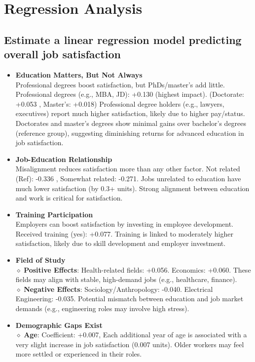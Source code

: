 \documentclass[12pt]{article}
\begin{document}
\section{Regression Analysis }
\subsection{Estimate a linear regression model predicting overall job satisfaction}

\begin{itemize}
    \item \textbf{Education Matters, But Not Always}\\
    Professional degrees boost satisfaction, but PhDs/master’s add little. Professional degrees (e.g., MBA, JD): +0.130 (highest impact). (Doctorate: +0.053 , Master’s: +0.018) Professional degree holders (e.g., lawyers, executives) report much higher satisfaction, likely due to higher pay/status.\\
    Doctorates and master’s degrees show minimal gains over bachelor’s degrees (reference group), suggesting diminishing returns for advanced education in job satisfaction.
    \item \textbf{Job-Education Relationship}\\
    Misalignment reduces satisfaction more than any other factor.     Not related (Ref): -0.336 , Somewhat related: -0.271. Jobs unrelated to education have much lower satisfaction (by 0.3+ units). Strong alignment between education and work is critical for satisfaction.
    \item \textbf{Training Participation }\\
    Employers can boost satisfaction by investing in employee development. Received training (yes): +0.077. Training is linked to moderately higher satisfaction, likely due to skill development and employer investment.
    \item \textbf{Field of Study}\\
    \:\;$\diamond$\textbf{ \:Positive Effects}: Health-related fields: +0.056. Economics: +0.060. These fields may align with stable, high-demand jobs (e.g., healthcare, finance).\\
    \:\;$\diamond$\textbf{ \:Negative Effects}: Sociology/Anthropology: -0.040. Electrical Engineering: -0.035. Potential mismatch between education and job market demands (e.g., engineering roles may involve high stress).
    \item \textbf{Demographic Gaps Exist}\\ \:\;$\diamond$\textbf{ \:Age}: Coefficient: +0.007, Each additional year of age is associated with a very slight increase in job satisfaction (0.007 units). Older workers may feel more settled or experienced in their roles.\\

\end{itemize}
\end{document}

